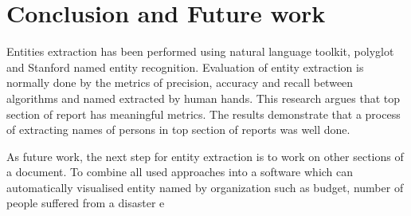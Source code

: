 \chapter{Conclusion and Future work}
Entities extraction has been performed using natural language toolkit, polyglot and Stanford named entity recognition.
Evaluation of entity extraction is normally done by the metrics of precision, accuracy and recall between algorithms and named extracted by human hands.  This research argues that top section of report has meaningful metrics. The results demonstrate that a process of extracting names of persons in top section of reports was well done.

As future work, the next step for entity extraction  is to work on other sections of a document.  To combine all used approaches into a software which can automatically visualised entity named by organization such as budget, number of people suffered from a disaster e